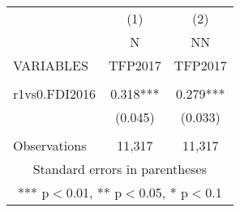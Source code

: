 \documentclass[]{article}
\begin{document}
\begin{tabular}{lcc} \hline
 & (1) & (2) \\
 & N & NN \\
VARIABLES & TFP2017 & TFP2017 \\ \hline
 &  &  \\
r1vs0.FDI2016 & 0.318*** & 0.279*** \\
 & (0.045) & (0.033) \\
 &  &  \\
 Observations & 11,317 & 11,317 \\ \hline
\multicolumn{3}{c}{ Standard errors in parentheses} \\
\multicolumn{3}{c}{ *** p$<$0.01, ** p$<$0.05, * p$<$0.1} \\
\end{tabular}
\end{document}
